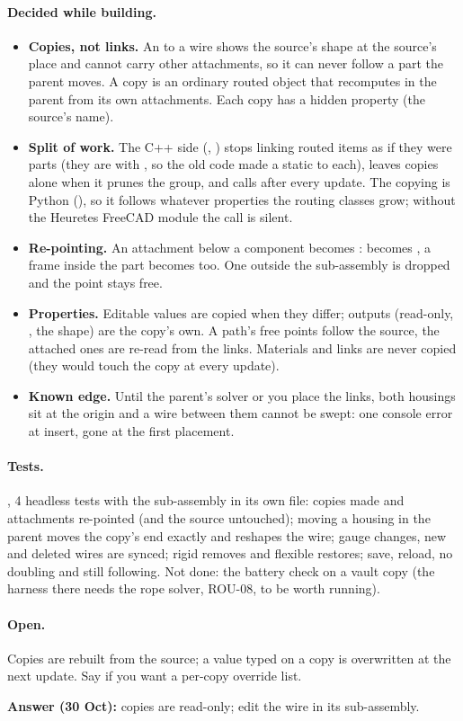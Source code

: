 \paragraph{Decided while building.}
\begin{itemize}[nosep]
  \item \textbf{Copies, not links.} An  to a wire shows the source's shape at the source's place and
        cannot carry other attachments, so it can never follow a part the parent moves. A copy is an ordinary routed
        object that recomputes in the parent from its own attachments. Each copy has a hidden 
        property (the source's name).
  \item \textbf{Split of work.} The C++ side (, \code{[BW]}) stops linking routed items as if
        they were parts (they are  with , so the old code made a static
         to each), leaves copies alone when it prunes the group, and calls
         after every update. The copying is Python
        (), so it follows whatever properties the routing classes grow; without the
        Heuretes FreeCAD module the call is silent.
  \item \textbf{Re-pointing.} An attachment  below a component becomes
        :  becomes
        , a frame inside the part becomes  too. One outside the
        sub-assembly is dropped and the point stays free.
  \item \textbf{Properties.} Editable values are copied when they differ; outputs (read-only, ,
        the shape) are the copy's own. A path's free points follow the source, the attached ones are re-read from the
        links. Materials and links are never copied (they would touch the copy at every update).
  \item \textbf{Known edge.} Until the parent's solver or you place the links, both housings sit at the origin and a
        wire between them cannot be swept: one console error at insert, gone at the first placement.
\end{itemize}

\paragraph{Tests.} , 4 headless tests with the sub-assembly in its own file: copies
made and attachments re-pointed (and the source untouched); moving a housing in the parent moves the copy's end
exactly and reshapes the wire; gauge changes, new and deleted wires are synced; rigid removes and flexible restores;
save, reload, no doubling and still following. Not done: the battery check on a vault copy (the harness there needs
the rope solver, ROU-08, to be worth running).

\paragraph{Open.} Copies are rebuilt from the source; a value typed on a copy is overwritten at the next update. Say
if you want a per-copy override list.

\textbf{Answer (30 Oct):} copies are read-only; edit the wire in its sub-assembly.
